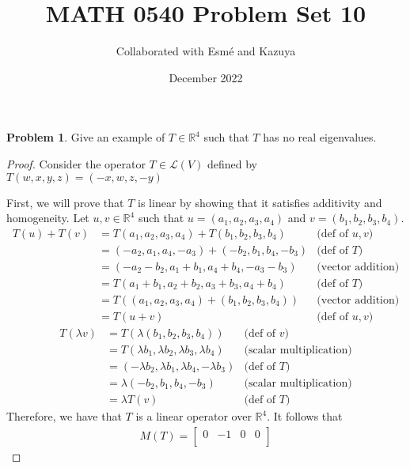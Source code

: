 \documentclass[12pt,reqno]{article}
\title{MATH 0540 Problem Set 10}
\author{Collaborated with Esmé and Kazuya}
\date{December 2022}
\newcommand{\R}{\mathbb{R}}
\theoremstyle{definition}
\newtheorem{problem}{Problem}
\begin{document}
\maketitle


\begin{problem} 
Give an example of $T \in \mathbb{R}^4$ such that $T$ has no real eigenvalues.
\end{problem}

\begin{proof}
    Consider the operator $T\in \mathcal{L}(V)$ defined by $T(w, x, y, z) = (-x, w, z, -y)$

    First, we will prove that $T$ is linear by showing that it satisfies additivity and homogeneity. Let $u,v\in\R^4$ such that $u = (a_1, a_2, a_3, a_4)$ and $v = (b_1, b_2, b_3, b_4)$.
    \begin{align*}
        T(u) + T(v) &= T(a_1, a_2, a_3, a_4) + T(b_1, b_2, b_3, b_4) & \text{(def of $u,v$)}\\
        &= (-a_2, a_1, a_4, -a_3) + (-b_2, b_1, b_4, -b_3) & \text{(def of $T$)}\\
        &= (-a_2 - b_2, a_1 + b_1, a_4 + b_4, -a_3 - b_3) & \text{(vector addition)}\\
        &= T(a_1 + b_1, a_2 + b_2, a_3 + b_3, a_4 + b_4) & \text{(def of $T$)}\\
        &= T((a_1, a_2, a_3, a_4) + (b_1, b_2, b_3, b_4)) & \text{(vector addition)}\\
        &= T(u + v) & \text{(def of $u,v$)}
    \end{align*}
    \begin{align*}
        T(\lambda v) &= T(\lambda(b_1,b_2,b_3,b_4)) & \text{(def of $v$)}\\
        &= T(\lambda b_1, \lambda b_2, \lambda b_3, \lambda b_4) & \text{(scalar multiplication)}\\
        &= (-\lambda b_2, \lambda b_1, \lambda b_4, -\lambda b_3) & \text{(def of $T$)}\\
        &= \lambda(-b_2, b_1, b_4, -b_3) & \text{(scalar multiplication)}\\
        &= \lambda T(v) & \text{(def of $T$)}
    \end{align*}
    Therefore, we have that $T$ is a linear operator over $\R^4$. It follows that
    \begin{align*}
        M(T) =
        \begin{bmatrix}
            0 & -1 & 0 & 0\\

\end{bmatrix}
\end{align*}
\end{proof}
\end{document}
